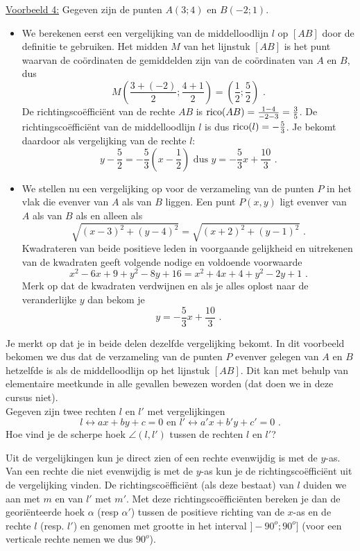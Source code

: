 \noindent \underline{Voorbeeld 4:} Gegeven zijn de punten $A(3;4)$ en $B(-2;1)$.
\begin{itemize}
\item We berekenen eerst een vergelijking van de middelloodlijn $l$ op $[AB]$ door de definitie te gebruiken.
Het midden $M$ van het lijnstuk $[AB]$ is het punt waarvan de co\"ordinaten de gemiddelden zijn van de co\"ordinaten van $A$ en $B$, dus 
\[
M(\frac{3+(-2)}{2};\frac{4+1}{2})=(\frac{1}{2};\frac{5}{2}) \text { .}
\]
De richtingsco\"effici\"ent van de rechte $AB$ is $\operatorname{rico} (AB)=\frac {1-4}{-2-3}=\frac{3}{5}$.
De richtingsco\"effici\"ent van de middelloodlijn $l$ is dus $\operatorname{rico} (l)=-\frac{5}{3}$.
Je bekomt daardoor als vergelijking van de rechte $l$:
\[
y-\frac{5}{2}=-\frac{5}{3}(x-\frac{1}{2}) \text { dus } y=-\frac{5}{3}x+\frac{10}{3} \text { .}
\]
\item We stellen nu een vergelijking op voor de verzameling van de punten $P$ in het vlak die evenver van $A$ als van $B$ liggen.
Een punt $P(x,y)$ ligt evenver van $A$ als van $B$ als en alleen als
\[
\sqrt{(x-3)^2+(y-4)^2}=\sqrt{(x+2)^2+(y-1)^2} \text { .}
\]
Kwadrateren van beide positieve leden in voorgaande gelijkheid en uitrekenen van de kwadraten geeft volgende nodige en voldoende voorwaarde
\[
x^2-6x+9+y^2-8y+16=x^2+4x+4+y^2-2y+1 \text { .}
\]
Merk op dat de kwadraten verdwijnen en als je alles oplost naar de veranderlijke $y$ dan bekom je
\[
y=-\frac{5}{3}x+\frac{10}{3} \text { .}
\]
\end{itemize}
Je merkt op dat je in beide delen dezelfde vergelijking bekomt.
In dit voorbeeld bekomen we dus dat de verzameling van de punten $P$ evenver gelegen van $A$ en $B$ hetzelfde is als de middelloodlijn op het lijnstuk $[AB]$.
Dit kan met behulp van elementaire meetkunde in alle gevallen bewezen worden (dat doen we in deze cursus niet).\\

Gegeven zijn twee rechten $l$ en $l'$ met vergelijkingen
\[
l \leftrightarrow ax+by+c=0 \text { en } l' \leftrightarrow a'x+b'y+c'=0 \text { .}
\]
Hoe vind je de scherpe hoek $\angle (l,l')$ tussen de rechten $l$ en $l'$?

Uit de vergelijkingen kun je direct zien of een rechte evenwijdig is met de $y$-as.
Van een rechte die niet evenwijdig is met de $y$-as kun je de richtingsco\"effici\"ent uit de vergelijking vinden.
De richtingsco\"effici\"ent (als deze bestaat) van $l$ duiden we aan met $m$ en van $l'$ met $m'$.
Met deze richtingsco\"effici\"enten bereken je dan de geori\"enteerde hoek $\alpha$ (resp $\alpha '$) tussen de positieve richting van de $x$-as en de rechte $l$ (resp. $l'$) en genomen met grootte in het interval $]-90^o;90^o]$ (voor een verticale rechte nemen we dus $90^o$).

